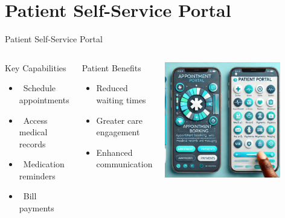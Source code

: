 \documentclass[aspectratio=169]{beamer}
\begin{document}
\section{Patient Self-Service Portal}
\begin{frame}{Patient Self-Service Portal}
    \begin{columns}[T]
            \begin{block}{Key Capabilities}
                \begin{itemize}
                    \item {}\ Schedule appointments
                    \item {}\ Access medical records
                    \item {}\ Medication reminders
                    \item {}\ Bill payments
                \end{itemize}
            \end{block}
            
            \begin{alertblock}{Patient Benefits}
                \begin{itemize}
                    \item Reduced waiting times
                    \item Greater care engagement
                    \item Enhanced communication
                \end{itemize}
            \end{alertblock}
            \includegraphics[width=0.8\textwidth]{patient_portal_illustration.png}
    \end{columns}
\end{frame}
\end{document}
